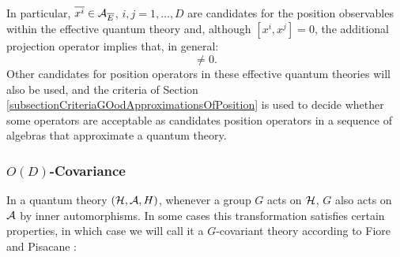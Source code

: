         

In particular, $\overline{x^i} \in \mathcal A_{\overline{E}}$, $i, j = 1, \dots, D$ are candidates for the position observables within the effective quantum theory and, although $[x^i, x^j] = 0$, the additional projection operator implies that, in general: 
\begin{equation}
    [\cut x^i, \cut x^j] \neq 0.
\end{equation}
Other candidates for position operators in these effective quantum theories will also be used, and the criteria of Section \ref{subsectionCriteriaGOodApproximationsOfPosition} is used to decide whether some operators are acceptable as candidates position operators in a sequence of algebras that approximate a quantum theory.

\subsubsection{$O(D)$-Covariance}

In a quantum theory $(\mathcal H, \mathcal A, H)$, whenever a group $G$ acts on $\mathcal H$, $G$ also acts on $\mathcal A$ by inner automorphisms. In some cases this transformation satisfies certain properties, in which case we will call it a $G$-covariant theory according to Fiore and Pisacane \cite{FioreTheCase2020}:

